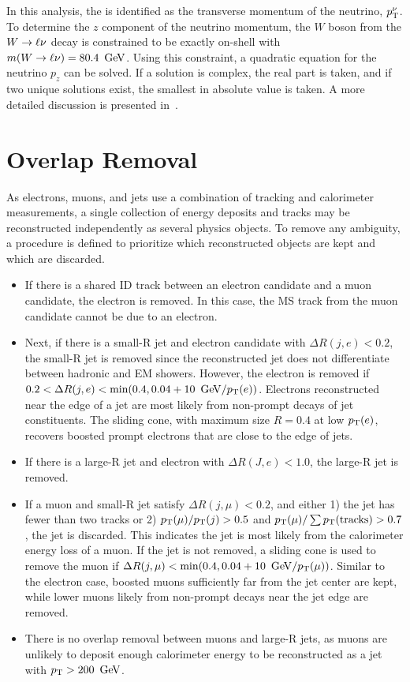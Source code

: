 In this analysis, the \MET is identified as the transverse momentum of the neutrino, $p_{\text{T}}^{\nu}$. To determine the $z$ component of the neutrino momentum, the $W$ boson from the $W\rightarrow\ell\nu$ decay is constrained to be exactly on-shell with $m(W\ra\ell\nu)=80.4\,\GeV$. Using this constraint, a quadratic equation for the neutrino $p_z$ can be solved. If a solution is complex, the real part is taken, and if two unique solutions exist, the smallest in absolute value is taken. A more detailed discussion is presented in~\App{\ref{ch:neutrinopz}}.

%
\section{Overlap Removal}
As electrons, muons, and jets use a combination of tracking and calorimeter measurements, a single collection of energy deposits and tracks may be reconstructed independently as several physics objects. To remove any ambiguity, a procedure is defined to prioritize which reconstructed objects are kept and which are discarded.

\begin{itemize}
\item If there is a shared ID track between an electron candidate and a muon candidate, the electron is removed. In this case, the MS track from the muon candidate cannot be due to an electron. 
\item Next, if there is a small-R jet and electron candidate with $\Delta R(j,e)<0.2$, the small-R jet is removed since the reconstructed jet does not differentiate between hadronic and EM showers. However, the electron is removed if $0.2<\Delta R(j,e)<\textrm{min}(0.4,0.04+10\,\GeV/\pT(e))$. Electrons reconstructed near the edge of a jet are most likely from non-prompt decays of jet constituents. The sliding cone, with maximum size $R=0.4$ at low $p_{\text{T}}(e)$, recovers boosted prompt electrons that are close to the edge of jets. 
\item If there is a large-R jet and electron with $\Delta R(J,e)<1.0$, the large-R jet is removed. 
\item If a muon and small-R jet satisfy $\Delta R(j,\mu)<0.2$, and either 1) the jet has fewer than two tracks or 2) $p_{\text{T}}(\mu)/p_{\text{T}}(j)>0.5$ and $p_{\text{T}}(\mu)/\sum p_{\text{T}}(\textrm{tracks})>0.7$, the jet is discarded. This indicates the jet is most likely from the calorimeter energy loss of a muon. If the jet is not removed, a sliding cone is used to remove the muon if $\Delta R(j,\mu)<\textrm{min}(0.4,0.04+10\,\GeV/\pT(\mu))$. Similar to the electron case, boosted muons sufficiently far from the jet center are kept, while lower \pT muons likely from non-prompt decays near the jet edge are removed. 
\item There is no overlap removal between muons and large-R jets, as muons are unlikely to deposit enough calorimeter energy to be reconstructed as a jet with $\pT>200\,\GeV$.
\end{itemize}

